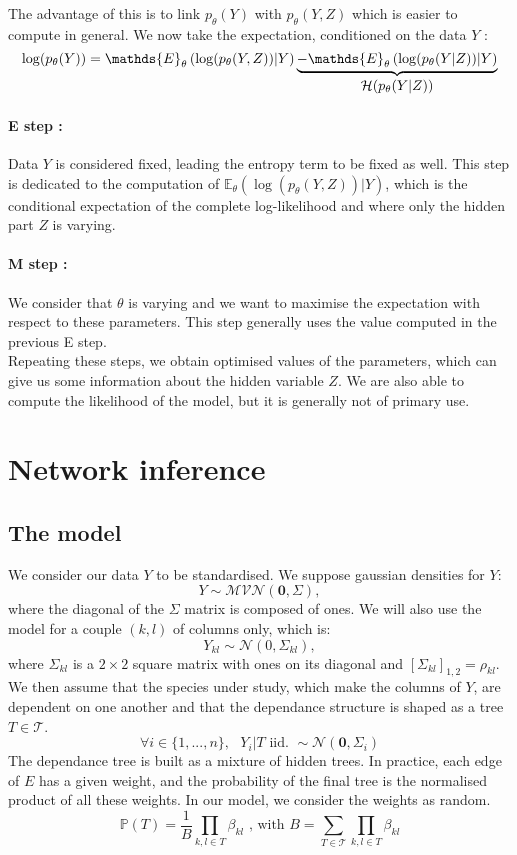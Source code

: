 \documentclass[a4paper,11pt]{article}
\begin{document}
The advantage of this is to link $p_\theta(Y)$ with $p_\theta (Y,Z)$ which is easier to compute in general. We now take the expectation,
conditioned on the data $Y$ :
\[ \log(p_\theta (Y) )= \mathds{E}_\theta \left(\log(p_\theta (Y,Z))|Y \right) \underbrace{- \mathds{E}_\theta \left(\log(p_\theta (Y|Z))|Y \right)}_{\text{\normalsize{$\mathcal{H}(p_\theta (Y|Z))$}}} \]

\paragraph{E step :}
Data $Y$ is considered fixed, leading the entropy term to be fixed as well. This step is dedicated to the computation of 
$\mathds{E}_\theta \left(\log(p_\theta (Y,Z))|Y \right)$, which is the conditional expectation of the complete log-likelihood and 
where only the hidden part $Z$ is varying. \\

\paragraph{M step :}
We consider that  $\theta$ is varying and we want to maximise the expectation with respect to these parameters. This step generally uses 
the value computed in the previous E step.\\

Repeating these steps, we obtain optimised values of the parameters, which can give us some information about the hidden variable $Z$. 
We are also able to compute the likelihood of the model, but it is generally not of primary use.

\section{Network inference}
  \subsection{The model}
  We consider our data $Y$ to be standardised. We suppose gaussian densities for $Y$:
  \[Y \sim \mathcal{MVN}(\mathbf{0},\Sigma),\]
  where the diagonal of the $\Sigma$ matrix is composed of ones. We will also use the model for a couple $(k,l)$ of columns only, which is:
  \[Y_{kl}\sim\mathcal{N}(0,\Sigma_{kl}),\]
  where $ \Sigma_{kl}$ is a $2\times 2$ square matrix with ones on its diagonal and $[\Sigma_{kl}]_{1,2} = \rho_{kl}$.\\
  
  We then assume that the species under study, which make the columns of $Y$, are dependent on one another and that the dependance structure
  is shaped as a tree $T\in\mathcal{T}$.\\
  \[\forall i\in\{1,...,n\},\text{  }Y_i|T \text{ iid. } \sim \mathcal{N}(\mathbf{0},\Sigma_i)\]
  The dependance tree is built as a mixture of hidden trees. In practice, each edge of $E$ has a given weight, and the probability of the final
  tree is the normalised product of all these weights. In our model, we consider the weights as random.
  \[ \mathds{P}(T) = \frac{1}{B}\prod_{k,l\in T} \beta_{kl} \text{ , with } B = \sum_{T\in\mathcal{T}} \prod_{k,l\in T} \beta_{kl} \]
  
\end{document}
